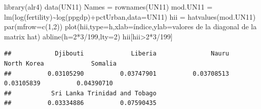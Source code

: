 \documentclass[
]{article}
\newenvironment{Shaded}{\begin{snugshade}}{\end{snugshade}}
\newcommand{\AttributeTok}[1]{\textcolor[rgb]{0.77,0.63,0.00}{#1}}
\newcommand{\DecValTok}[1]{\textcolor[rgb]{0.00,0.00,0.81}{#1}}
\newcommand{\FunctionTok}[1]{\textcolor[rgb]{0.00,0.00,0.00}{#1}}
\newcommand{\NormalTok}[1]{#1}
\newcommand{\OtherTok}[1]{\textcolor[rgb]{0.56,0.35,0.01}{#1}}
\newcommand{\SpecialCharTok}[1]{\textcolor[rgb]{0.00,0.00,0.00}{#1}}
\newcommand{\StringTok}[1]{\textcolor[rgb]{0.31,0.60,0.02}{#1}}
\begin{document}
\begin{Shaded}
\begin{Highlighting}[]
\FunctionTok{library}\NormalTok{(alr4)}
\FunctionTok{data}\NormalTok{(UN11)}
\NormalTok{Names }\OtherTok{=} \FunctionTok{rownames}\NormalTok{(UN11)}
\NormalTok{mod.UN11 }\OtherTok{=} \FunctionTok{lm}\NormalTok{(}\FunctionTok{log}\NormalTok{(fertility)}\SpecialCharTok{\textasciitilde{}}\FunctionTok{log}\NormalTok{(ppgdp)}\SpecialCharTok{+}\NormalTok{pctUrban,}\AttributeTok{data=}\NormalTok{UN11)}
\NormalTok{hii }\OtherTok{=} \FunctionTok{hatvalues}\NormalTok{(mod.UN11)}
\FunctionTok{par}\NormalTok{(}\AttributeTok{mfrow=}\FunctionTok{c}\NormalTok{(}\DecValTok{1}\NormalTok{,}\DecValTok{2}\NormalTok{))}
\FunctionTok{plot}\NormalTok{(hii,}\AttributeTok{type=}\StringTok{\textquotesingle{}h\textquotesingle{}}\NormalTok{,}\AttributeTok{xlab=}\StringTok{\textquotesingle{}índice\textquotesingle{}}\NormalTok{,}\AttributeTok{ylab=}\StringTok{\textquotesingle{}valores de la diagonal de la matrix hat\textquotesingle{}}\NormalTok{)}
\FunctionTok{abline}\NormalTok{(}\AttributeTok{h=}\DecValTok{2}\SpecialCharTok{*}\DecValTok{3}\SpecialCharTok{/}\DecValTok{199}\NormalTok{,}\AttributeTok{lty=}\DecValTok{2}\NormalTok{)}
\NormalTok{hii[hii}\SpecialCharTok{\textgreater{}}\DecValTok{2}\SpecialCharTok{*}\DecValTok{3}\SpecialCharTok{/}\DecValTok{199}\NormalTok{]}
\end{Highlighting}
\end{Shaded}

\begin{verbatim}
##            Djibouti             Liberia               Nauru         North Korea             Somalia 
##          0.03105290          0.03747901          0.03708513          0.03105839          0.04390710 
##           Sri Lanka Trinidad and Tobago 
##          0.03334886          0.07590435
\end{verbatim}

\begin{Shaded}
\end{Shaded}
\end{document}
